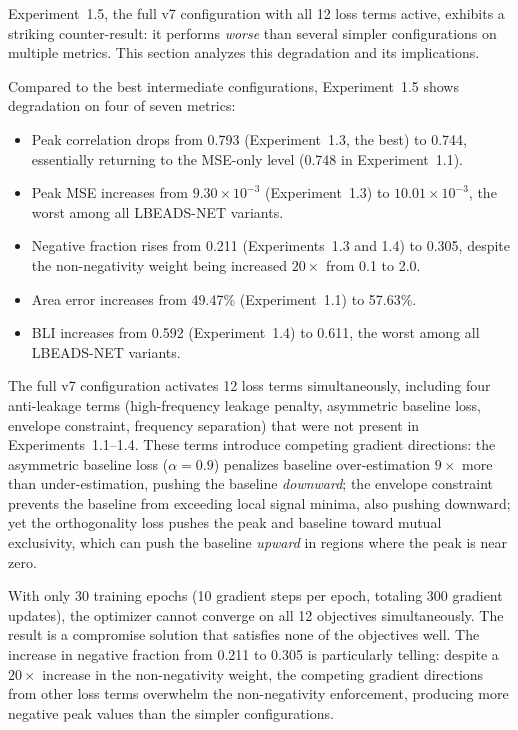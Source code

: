 Experiment~1.5, the full v7 configuration with all 12 loss terms active, exhibits a striking counter-result: it performs \emph{worse} than several simpler configurations on multiple metrics. This section analyzes this degradation and its implications.

Compared to the best intermediate configurations, Experiment~1.5 shows degradation on four of seven metrics:
\begin{itemize}
    \item Peak correlation drops from 0.793 (Experiment~1.3, the best) to 0.744, essentially returning to the MSE-only level (0.748 in Experiment~1.1).
    \item Peak MSE increases from $9.30 \times 10^{-3}$ (Experiment~1.3) to $10.01 \times 10^{-3}$, the worst among all LBEADS-NET variants.
    \item Negative fraction rises from 0.211 (Experiments~1.3 and 1.4) to 0.305, despite the non-negativity weight being increased $20\times$ from 0.1 to 2.0.
    \item Area error increases from 49.47\% (Experiment~1.1) to 57.63\%.
    \item BLI increases from 0.592 (Experiment~1.4) to 0.611, the worst among all LBEADS-NET variants.
\end{itemize}

The full v7 configuration activates 12 loss terms simultaneously, including four anti-leakage terms (high-frequency leakage penalty, asymmetric baseline loss, envelope constraint, frequency separation) that were not present in Experiments~1.1--1.4. These terms introduce competing gradient directions: the asymmetric baseline loss ($\alpha = 0.9$) penalizes baseline over-estimation $9\times$ more than under-estimation, pushing the baseline \emph{downward}; the envelope constraint prevents the baseline from exceeding local signal minima, also pushing downward; yet the orthogonality loss pushes the peak and baseline toward mutual exclusivity, which can push the baseline \emph{upward} in regions where the peak is near zero.

With only 30 training epochs (10 gradient steps per epoch, totaling 300 gradient updates), the optimizer cannot converge on all 12 objectives simultaneously. The result is a compromise solution that satisfies none of the objectives well. The increase in negative fraction from 0.211 to 0.305 is particularly telling: despite a $20\times$ increase in the non-negativity weight, the competing gradient directions from other loss terms overwhelm the non-negativity enforcement, producing more negative peak values than the simpler configurations.

